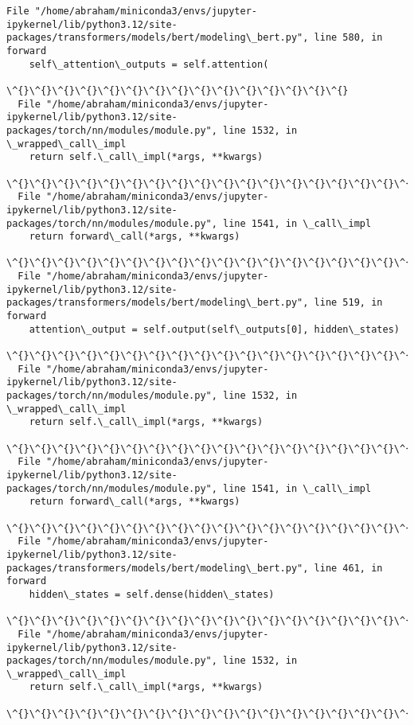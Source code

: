 \documentclass[11pt]{article}
\begin{document}
\begin{Verbatim}[commandchars=\\\{\}]
  File "/home/abraham/miniconda3/envs/jupyter-ipykernel/lib/python3.12/site-
packages/transformers/models/bert/modeling\_bert.py", line 580, in forward
    self\_attention\_outputs = self.attention(
                             \^{}\^{}\^{}\^{}\^{}\^{}\^{}\^{}\^{}\^{}\^{}\^{}\^{}\^{}\^{}
  File "/home/abraham/miniconda3/envs/jupyter-ipykernel/lib/python3.12/site-
packages/torch/nn/modules/module.py", line 1532, in \_wrapped\_call\_impl
    return self.\_call\_impl(*args, **kwargs)
           \^{}\^{}\^{}\^{}\^{}\^{}\^{}\^{}\^{}\^{}\^{}\^{}\^{}\^{}\^{}\^{}\^{}\^{}\^{}\^{}\^{}\^{}\^{}\^{}\^{}\^{}\^{}\^{}\^{}\^{}\^{}\^{}
  File "/home/abraham/miniconda3/envs/jupyter-ipykernel/lib/python3.12/site-
packages/torch/nn/modules/module.py", line 1541, in \_call\_impl
    return forward\_call(*args, **kwargs)
           \^{}\^{}\^{}\^{}\^{}\^{}\^{}\^{}\^{}\^{}\^{}\^{}\^{}\^{}\^{}\^{}\^{}\^{}\^{}\^{}\^{}\^{}\^{}\^{}\^{}\^{}\^{}\^{}\^{}
  File "/home/abraham/miniconda3/envs/jupyter-ipykernel/lib/python3.12/site-
packages/transformers/models/bert/modeling\_bert.py", line 519, in forward
    attention\_output = self.output(self\_outputs[0], hidden\_states)
                       \^{}\^{}\^{}\^{}\^{}\^{}\^{}\^{}\^{}\^{}\^{}\^{}\^{}\^{}\^{}\^{}\^{}\^{}\^{}\^{}\^{}\^{}\^{}\^{}\^{}\^{}\^{}\^{}\^{}\^{}\^{}\^{}\^{}\^{}\^{}\^{}\^{}\^{}\^{}\^{}\^{}\^{}\^{}
  File "/home/abraham/miniconda3/envs/jupyter-ipykernel/lib/python3.12/site-
packages/torch/nn/modules/module.py", line 1532, in \_wrapped\_call\_impl
    return self.\_call\_impl(*args, **kwargs)
           \^{}\^{}\^{}\^{}\^{}\^{}\^{}\^{}\^{}\^{}\^{}\^{}\^{}\^{}\^{}\^{}\^{}\^{}\^{}\^{}\^{}\^{}\^{}\^{}\^{}\^{}\^{}\^{}\^{}\^{}\^{}\^{}
  File "/home/abraham/miniconda3/envs/jupyter-ipykernel/lib/python3.12/site-
packages/torch/nn/modules/module.py", line 1541, in \_call\_impl
    return forward\_call(*args, **kwargs)
           \^{}\^{}\^{}\^{}\^{}\^{}\^{}\^{}\^{}\^{}\^{}\^{}\^{}\^{}\^{}\^{}\^{}\^{}\^{}\^{}\^{}\^{}\^{}\^{}\^{}\^{}\^{}\^{}\^{}
  File "/home/abraham/miniconda3/envs/jupyter-ipykernel/lib/python3.12/site-
packages/transformers/models/bert/modeling\_bert.py", line 461, in forward
    hidden\_states = self.dense(hidden\_states)
                    \^{}\^{}\^{}\^{}\^{}\^{}\^{}\^{}\^{}\^{}\^{}\^{}\^{}\^{}\^{}\^{}\^{}\^{}\^{}\^{}\^{}\^{}\^{}\^{}\^{}
  File "/home/abraham/miniconda3/envs/jupyter-ipykernel/lib/python3.12/site-
packages/torch/nn/modules/module.py", line 1532, in \_wrapped\_call\_impl
    return self.\_call\_impl(*args, **kwargs)
           \^{}\^{}\^{}\^{}\^{}\^{}\^{}\^{}\^{}\^{}\^{}\^{}\^{}\^{}\^{}\^{}\^{}\^{}\^{}\^{}\^{}\^{}\^{}\^{}\^{}\^{}\^{}\^{}\^{}\^{}\^{}\^{}

\end{Verbatim}
\end{document}
